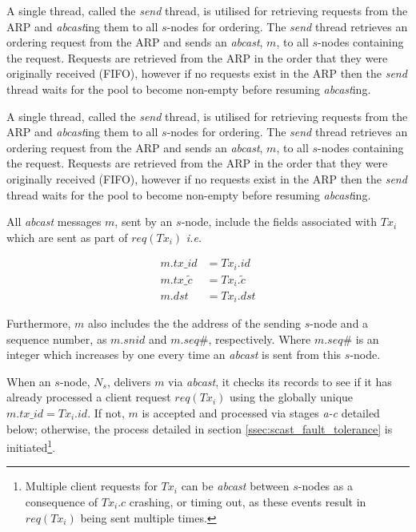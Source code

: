 \begin{enumerate}
        A single thread, called the \emph{send} thread, is utilised for retrieving requests from the ARP and \emph{abcast}ing them to all $s$-nodes for ordering.  The \emph{send} thread retrieves an ordering request from the ARP and sends an \emph{abcast}, $m$, to all $s$-nodes containing the request.  Requests are retrieved from the ARP in the order that they were originally received (FIFO), however if no requests exist in the ARP then the \emph{send} thread waits for the pool to become non-empty before resuming \emph{abcast}ing.          
        
        A single thread, called the \emph{send} thread, is utilised for retrieving requests from the ARP and \emph{abcast}ing them to all $s$-nodes for ordering.  The \emph{send} thread retrieves an ordering request from the ARP and sends an \emph{abcast}, $m$, to all $s$-nodes containing the request.  Requests are retrieved from the ARP in the order that they were originally received (FIFO), however if no requests exist in the ARP then the \emph{send} thread waits for the pool to become non-empty before resuming \emph{abcast}ing.  
		
		All \emph{abcast} messages $m$, sent by an $s$-node, include the fields associated with $Tx_i$ which are sent as part of $req(Tx_i)$ \emph{i.e.}
		
		\begin{equation*}
			\begin{split}
			    m.tx\_id &= Tx_i.id \\
			    m.tx\_\tilde{c} &= Tx_i.\tilde{c} \\
	           m.dst &= Tx_i.dst
	        \end{split}
		\end{equation*}
		
		Furthermore, $m$ also includes the the address of the sending $s$-node and a sequence number, as $m.snid$ and $m.seq\#$, respectively.  Where $m.seq\#$ is an integer which increases by one every time an \emph{abcast} is sent from this $s$-node.  
		
		When an $s$-node, $N_s$, delivers $m$ via \emph{abcast}, it checks its records to see if it has already processed a client request $req(Tx_i)$ using the globally unique $m.tx\_id = Tx_i.id$.  If not, $m$ is accepted and processed via stages \emph{a-c} detailed below; otherwise, the process detailed in section \ref{ssec:scast_fault_tolerance} is initiated\footnote{Multiple client requests for $Tx_i$ can be \emph{abcast} between $s$-nodes as a consequence of $Tx_i.c$ crashing, or timing out, as these events result in $req(Tx_i)$ being sent multiple times.}.  
		

\end{enumerate}
